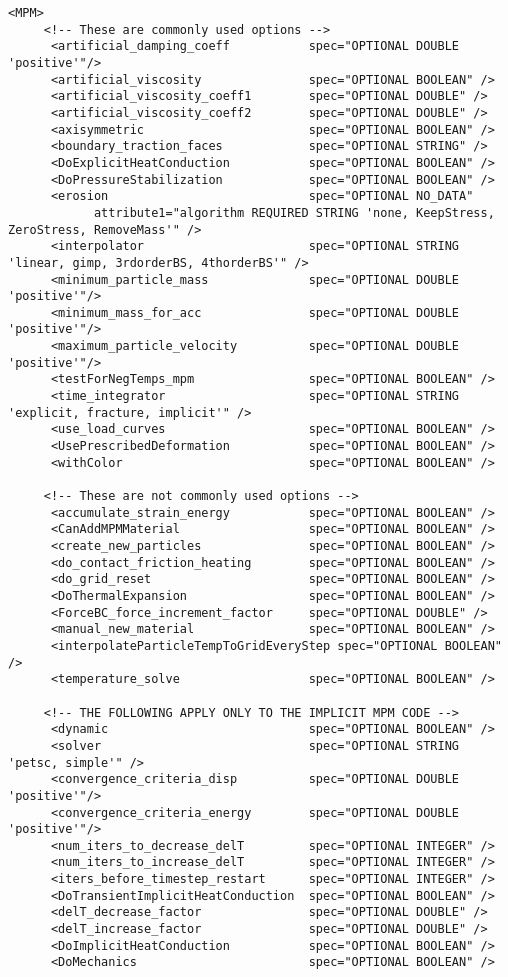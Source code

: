 \begin{Verbatim}[fontsize=\footnotesize]
    <MPM>
     <!-- These are commonly used options -->
      <artificial_damping_coeff           spec="OPTIONAL DOUBLE 'positive'"/>
      <artificial_viscosity               spec="OPTIONAL BOOLEAN" />
      <artificial_viscosity_coeff1        spec="OPTIONAL DOUBLE" />
      <artificial_viscosity_coeff2        spec="OPTIONAL DOUBLE" />
      <axisymmetric                       spec="OPTIONAL BOOLEAN" />
      <boundary_traction_faces            spec="OPTIONAL STRING" />
      <DoExplicitHeatConduction           spec="OPTIONAL BOOLEAN" />
      <DoPressureStabilization            spec="OPTIONAL BOOLEAN" />
      <erosion                            spec="OPTIONAL NO_DATA"
            attribute1="algorithm REQUIRED STRING 'none, KeepStress, ZeroStress, RemoveMass'" />
      <interpolator                       spec="OPTIONAL STRING 'linear, gimp, 3rdorderBS, 4thorderBS'" />
      <minimum_particle_mass              spec="OPTIONAL DOUBLE 'positive'"/>
      <minimum_mass_for_acc               spec="OPTIONAL DOUBLE 'positive'"/>
      <maximum_particle_velocity          spec="OPTIONAL DOUBLE 'positive'"/>
      <testForNegTemps_mpm                spec="OPTIONAL BOOLEAN" />
      <time_integrator                    spec="OPTIONAL STRING 'explicit, fracture, implicit'" />
      <use_load_curves                    spec="OPTIONAL BOOLEAN" />
      <UsePrescribedDeformation           spec="OPTIONAL BOOLEAN" />
      <withColor                          spec="OPTIONAL BOOLEAN" />

     <!-- These are not commonly used options -->
      <accumulate_strain_energy           spec="OPTIONAL BOOLEAN" />
      <CanAddMPMMaterial                  spec="OPTIONAL BOOLEAN" />
      <create_new_particles               spec="OPTIONAL BOOLEAN" />
      <do_contact_friction_heating        spec="OPTIONAL BOOLEAN" />
      <do_grid_reset                      spec="OPTIONAL BOOLEAN" />
      <DoThermalExpansion                 spec="OPTIONAL BOOLEAN" />
      <ForceBC_force_increment_factor     spec="OPTIONAL DOUBLE" />
      <manual_new_material                spec="OPTIONAL BOOLEAN" />
      <interpolateParticleTempToGridEveryStep spec="OPTIONAL BOOLEAN" />
      <temperature_solve                  spec="OPTIONAL BOOLEAN" />

     <!-- THE FOLLOWING APPLY ONLY TO THE IMPLICIT MPM CODE -->
      <dynamic                            spec="OPTIONAL BOOLEAN" />
      <solver                             spec="OPTIONAL STRING 'petsc, simple'" />
      <convergence_criteria_disp          spec="OPTIONAL DOUBLE 'positive'"/>
      <convergence_criteria_energy        spec="OPTIONAL DOUBLE 'positive'"/>
      <num_iters_to_decrease_delT         spec="OPTIONAL INTEGER" />
      <num_iters_to_increase_delT         spec="OPTIONAL INTEGER" />
      <iters_before_timestep_restart      spec="OPTIONAL INTEGER" />
      <DoTransientImplicitHeatConduction  spec="OPTIONAL BOOLEAN" />
      <delT_decrease_factor               spec="OPTIONAL DOUBLE" />
      <delT_increase_factor               spec="OPTIONAL DOUBLE" />
      <DoImplicitHeatConduction           spec="OPTIONAL BOOLEAN" />
      <DoMechanics                        spec="OPTIONAL BOOLEAN" />


\end{Verbatim}
